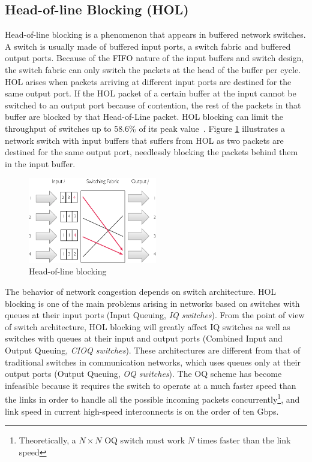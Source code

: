 \documentclass[12pt]{article}
\begin{document}
\subsection{Head-of-line Blocking (HOL)}\label{S:hol_blocking} Head-of-line blocking is a phenomenon that appears in buffered network switches. A switch is usually made of buffered input ports, a switch fabric and buffered output ports. Because of the FIFO nature of the input buffers and switch design, the switch fabric can only switch the packets at the head of the buffer per cycle. HOL arises when packets arriving at different input ports are destined for the same output port. If the HOL packet of a certain buffer at the input cannot be switched to an output port because of contention, the rest of the packets in that buffer are blocked by that Head-of-Line packet. HOL blocking can limit the throughput of switches up to 58.6\% of its peak value~\cite{hol_thoughput}. Figure \ref{fig:hol} illustrates a network switch with input buffers that suffers from HOL as two packets are destined for the same output port, needlessly blocking the packets behind them in the input buffer.

\begin{figure}[ht]
	\centering
		\includegraphics[width=0.50\textwidth]{hol_blocking.pdf}
		\caption{Head-of-line blocking}
		\label{fig:hol}
\end{figure}

The behavior of network congestion depends on switch architecture. HOL blocking is one of the main problems arising in networks based on switches with queues at their input ports (Input Queuing, \emph{IQ switches}). From the point of view of switch architecture, HOL blocking will greatly affect IQ switches as well as switches with queues at their input and output ports (Combined Input and Output Queuing, \emph{CIOQ switches}). These architectures are different from that of traditional switches in communication networks, which uses queues only at their output ports (Output Queuing, \emph{OQ switches}). The OQ scheme has become infeasible because it requires the switch to operate at a much faster speed than the links in order to handle all the possible incoming packets concurrently\footnote{Theoretically, a ${N \times N}$ OQ switch must work ${N}$ times faster than the link speed}, and link speed in current high-speed interconnects is on the order of ten Gbps. 
\end{document}

